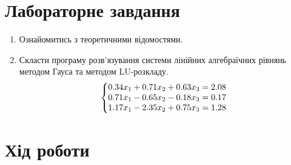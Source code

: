 \documentclass{article}
\begin{document}
\begin{large}
		\section*{Лабораторне завдання}
		\begin{enumerate}
			\item Ознайомитись з теоретичними відомостями.
			\item Скласти програму розв’язування системи лінійних алгебраїчних рівнянь
			методом Гауса та методом LU-розкладу.
			\begin{gather}\nonumber
				\left\{\begin{array}{@{}l@{}}
					0.34x_1 + 0.71x_2 + 0.63x_3 = 2.08\\\nonumber
					0.71x_1 - 0.65x_2 - 0.18x_3 = 0.17\\\nonumber
					1.17x_1 - 2.35x_2 + 0.75x_3 = 1.28\nonumber
				\end{array}\right.\,
			\end{gather}
		\end{enumerate}
	
		\section*{Хід роботи}

\end{large}
\end{document}

